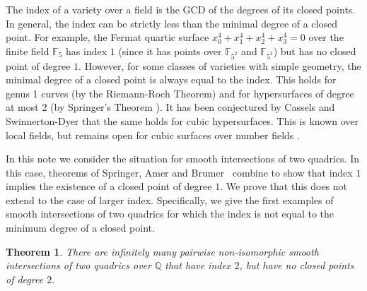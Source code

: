 \documentclass[12pt, reqno]{amsart}
\newtheorem{thm}[lemma]{Theorem}
\theoremstyle{definition}
\newcommand{\F}{{\mathbb F}}
\newcommand{\Q}{{\mathbb Q}}
\begin{document}










The index of a variety over a field is the GCD of the degrees of its closed points. In general, the index can be strictly less than the minimal degree of a closed point. For example, the Fermat quartic surface $x_0^4 + x_1^4 + x_2^4 + x_3^4 = 0$ over the finite field $\F_5$ has index $1$ (since it has points over $\F_{5^2}$ and $\F_{5^3}$) but has no closed point of degree $1$. However, for some classes of varieties with simple geometry, the minimal degree of a closed point is always equal to the index. 
This holds for genus 1 curves (by the Riemann-Roch Theorem) and for hypersurfaces of degree at most \(2\) (by Springer's Theorem \cite{Springer}). It has been conjectured by Cassels and Swinnerton-Dyer that the same holds for cubic hypersurfaces. This is known over local fields, but remains open for cubic surfaces over number fields \cite{Coray}.

In this note we consider the situation for smooth intersections of two quadrics. In this case, theorems of Springer, Amer and Brumer~\cites{Springer, Amer, Brumer} combine to show that index $1$ implies the existence of a closed point of degree $1$. We prove that this does not extend to the case of larger index. Specifically, we give the first examples of smooth intersections of two quadrics for which the index is not equal to the minimum degree of a closed point.

\begin{thm}\label{thm:Intro}
	There are infinitely many pairwise non-isomorphic smooth intersections of two quadrics over $\Q$ that have index \(2\), but have no closed points of degree $2$.
\end{thm}
\end{document}
